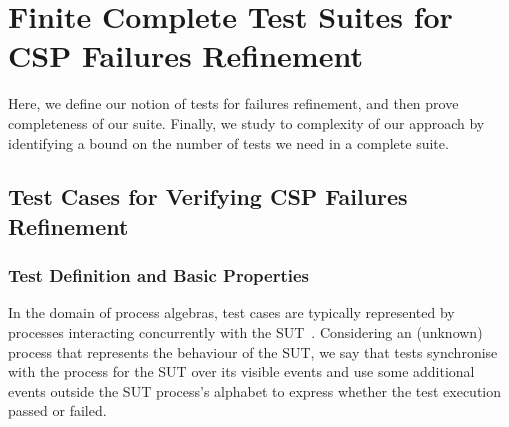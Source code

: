 \section{Finite Complete Test Suites for CSP Failures Refinement}
\label{sec:finitecompletefails}

Here, we define our notion of tests for failures refinement, and then prove
completeness of our suite. Finally, we study to complexity of our approach by
identifying a bound on the number of tests we need in a complete suite.

\subsection{Test Cases for Verifying CSP Failures Refinement}

\subsubsection*{Test Definition and Basic Properties}

In the domain of process algebras, test cases are typically represented by
processes interacting concurrently with the
SUT~\cite{Hennessy:1988:ATP:50497}. Considering an (unknown) process that
represents the behaviour of the SUT, we say that tests synchronise with the
process for the SUT over its visible events and use some additional events
outside the SUT process's alphabet to express whether the test execution
passed or failed.

